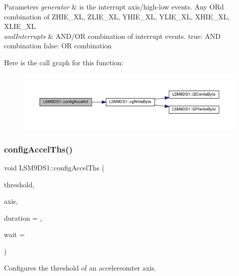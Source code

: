 \begin{DoxyParams}{Parameters}
{\em generator} & is the interrupt axis/high-\/low events. Any OR\textquotesingle{}d combination of Z\+H\+I\+E\+\_\+\+XL, Z\+L\+I\+E\+\_\+\+XL, Y\+H\+I\+E\+\_\+\+XL, Y\+L\+I\+E\+\_\+\+XL, X\+H\+I\+E\+\_\+\+XL, X\+L\+I\+E\+\_\+\+XL \\
\hline
{\em and\+Interrupts} & A\+N\+D/\+OR combination of interrupt events. true\+: A\+ND combination false\+: OR combination \\
\hline
\end{DoxyParams}
Here is the call graph for this function\+:
\nopagebreak
\begin{figure}[H]
\begin{center}
\leavevmode
\includegraphics[width=350pt]{classLSM9DS1_a1e8ebc6c1e3876d8936197dc93f76717_cgraph}
\end{center}
\end{figure}
\mbox{\label{classLSM9DS1_acebcf64ab4e6ea7ed7a23c09ef16afe9}} 
\subsubsection{\texorpdfstring{config\+Accel\+Ths()}{configAccelThs()}}
{\footnotesize\ttfamily void L\+S\+M9\+D\+S1\+::config\+Accel\+Ths (\begin{DoxyParamCaption}\item[{uint8\+\_\+t}]{threshold,  }\item[{lsm9ds1\+\_\+axis}]{axis,  }\item[{uint8\+\_\+t}]{duration = {},  }\item[{bool}]{wait = {} }\end{DoxyParamCaption})}



Configures the threshold of an accelereomter axis. 


